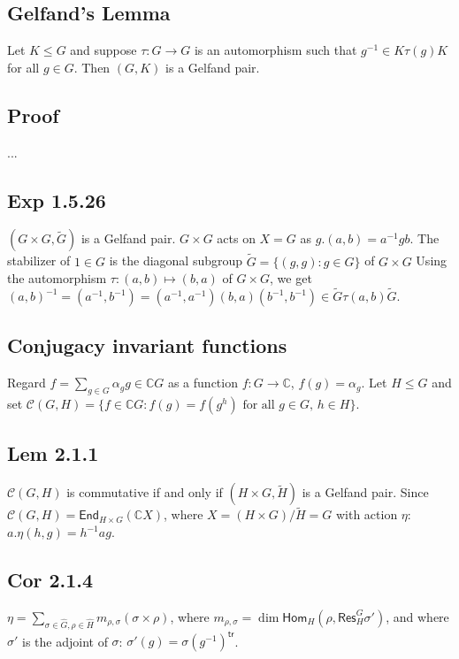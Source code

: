 \documentclass[a4paper]{amsart}
\newcommand{\C}{\mathbb{C}}
\newcommand{\CC}{\mathcal{C}}
\newcommand{\Hom}{\mathsf{Hom}}
\newcommand{\End}{\mathsf{End}}
\newcommand{\Res}{\mathsf{Res}}
\begin{document}
\subsection{Gelfand's Lemma}
Let $K \leq G$ and suppose $\tau \colon G \to G$ is an automorphism
such that $g^{-1} \in K \tau(g) K$ for all $g \in G$.  Then $(G, K)$ is
a Gelfand pair.

\subsection{Proof} ...



\subsection{Exp 1.5.26}
$(G \times G, \tilde{G})$ is a Gelfand pair.
$G \times G$ acts on $X = G$ as $g.(a,b) = a^{-1} g b$.
The stabilizer of $1 \in G$ is the diagonal subgroup $\tilde{G} = \{(g, g) : g \in G\}$ of $G \times G$
Using the automorphism $\tau \colon (a, b) \mapsto (b, a)$ of $G \times G$, we get $(a, b)^{-1} = (a^{-1}, b^{-1}) = 
(a^{-1}, a^{-1})(b, a)(b^{-1}, b^{-1}) \in 
\tilde{G}\tau(a,b)\tilde{G}$.


\subsection{Conjugacy invariant functions}
Regard $f = \sum_{g \in G} \alpha_g g \in \C G$ as a function
$f \colon G \to \C$, $f(g) = \alpha_g$.
Let $H \leq G$ and set 
$\CC(G, H) = \{ f \in \C G : f(g) = f(g^h) \text{ for all } g \in G,\, h \in H\}$.

\subsection{Lem 2.1.1}
$\CC(G, H)$ is commutative if and only if $(H \times G, \tilde{H})$ is
a Gelfand pair.  Since $\CC(G, H) = \End_{H \times G}(\C X)$, where $X
= (H \times G)/\tilde{H} = G$ with action $\eta:$ $a.\eta(h,g) = h^{-1}a g$.


\subsection{Cor 2.1.4}
$\eta = \sum_{\sigma \in \hat{G}, \rho \in \hat{H}} m_{\rho, \sigma} (\sigma \times \rho)$, where 
$m_{\rho, \sigma} = \dim \Hom_H(\rho, \Res^G_H \sigma')$,
and where $\sigma'$ is the adjoint of $\sigma$: $\sigma'(g) = \sigma(g^{-1})^{\mathsf{tr}}$.
\end{document}
